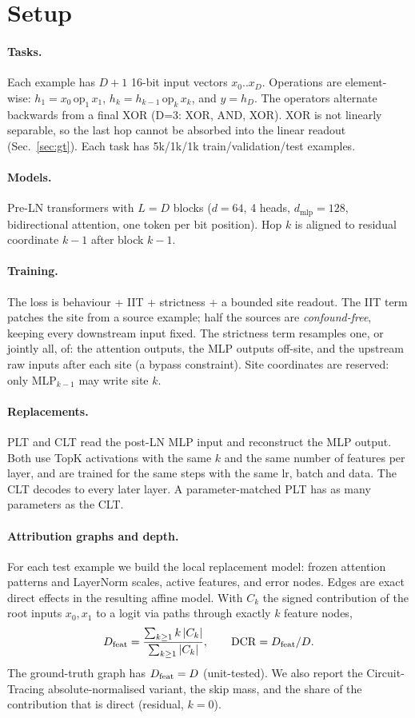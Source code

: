 \section{Setup}
\paragraph{Tasks.} Each example has $D{+}1$ 16-bit input vectors $x_0..x_D$. Operations are element-wise: $h_1=x_0\,\mathrm{op}_1\,x_1$, $h_k=h_{k-1}\,\mathrm{op}_k\,x_k$, and $y=h_D$. The operators alternate backwards from a final XOR (D=3: XOR, AND, XOR). XOR is not linearly separable, so the last hop cannot be absorbed into the linear readout (Sec.~\ref{sec:gt}). Each task has 5k/1k/1k train/validation/test examples.
\paragraph{Models.} Pre-LN transformers with $L=D$ blocks ($d=64$, 4 heads, $d_\mathrm{mlp}=128$, bidirectional attention, one token per bit position). Hop $k$ is aligned to residual coordinate $k{-}1$ after block $k{-}1$.
\paragraph{Training.} The loss is behaviour + IIT + strictness + a bounded site readout. The IIT term patches the site from a source example; half the sources are \emph{confound-free}, keeping every downstream input fixed. The strictness term resamples one, or jointly all, of: the attention outputs, the MLP outputs off-site, and the upstream raw inputs after each site (a bypass constraint). Site coordinates are reserved: only MLP$_{k-1}$ may write site $k$.
\paragraph{Replacements.} PLT and CLT read the post-LN MLP input and reconstruct the MLP output. Both use TopK activations with the same $k$ and the same number of features per layer, and are trained for the same steps with the same lr, batch and data. The CLT decodes to every later layer. A parameter-matched PLT has as many parameters as the CLT.
\paragraph{Attribution graphs and depth.} For each test example we build the local replacement model: frozen attention patterns and LayerNorm scales, active features, and error nodes. Edges are exact direct effects in the resulting affine model. With $C_k$ the signed contribution of the root inputs $x_0,x_1$ to a logit via paths through exactly $k$ feature nodes,
\begin{equation}
D_{\mathrm{feat}}=\frac{\sum_{k\ge1}k\,|C_k|}{\sum_{k\ge1}|C_k|},\qquad \mathrm{DCR}=D_{\mathrm{feat}}/D .
\end{equation}
The ground-truth graph has $D_{\mathrm{feat}}=D$ (unit-tested). We also report the Circuit-Tracing absolute-normalised variant, the skip mass, and the share of the contribution that is direct (residual, $k{=}0$).
